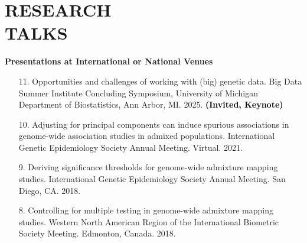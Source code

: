 \documentclass[margin]{res}
\newcommand{\annotate}[1]{\textcolor{black}{\textbf{(#1)}}}
\newcommand{\annotateItem}[1]{
	\begin{itemize} \vspace{-0.1cm}
	\item[] 
	\begin{footnotesize}\textcolor{black}{(#1)}\end{footnotesize}
	\end{itemize} \vspace{-0.1cm}
}
\begin{document}
\begin{resume}
\begin{itemize}
\end{itemize}



\section{RESEARCH \\TALKS}

\textbf{Presentations at International or National Venues}

\begin{itemize}
\item[11.] Opportunities and challenges of working with (big) genetic data. Big Data Summer Institute Concluding Symposium, University of Michigan Department of Biostatistics, Ann Arbor, MI. 2025. %
\annotate{Invited, Keynote}
	
\item[10.] Adjusting for principal components can induce spurious associations in genome-wide association studies in admixed populations. 
International Genetic Epidemiology Society Annual Meeting. Virtual. 2021. %
	
\item[9.] Deriving significance thresholds for genome-wide admixture mapping studies. 
International Genetic Epidemiology Society Annual Meeting. San Diego, CA. 2018. 

\item[8.] Controlling for multiple testing in genome-wide admixture mapping studies. 
Western North American Region of the International Biometric Society Meeting. Edmonton, Canada. 2018. %
	

\end{itemize}
\end{resume}
\end{document}
